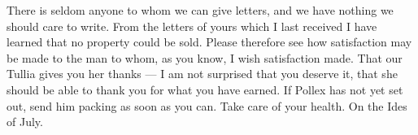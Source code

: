

 There is seldom anyone to whom we can give letters, and we have nothing we should care to write. From the letters of yours which I last received I have learned that no property could be sold. Please therefore see how satisfaction may be made to the man to whom, as you know, I wish satisfaction made. That our Tullia gives you her thanks --- I am not surprised that you deserve it, that she should be able to thank you for what you have earned. If Pollex has not yet set out, send him packing as soon as you can. Take care of your health. On the Ides of July.
